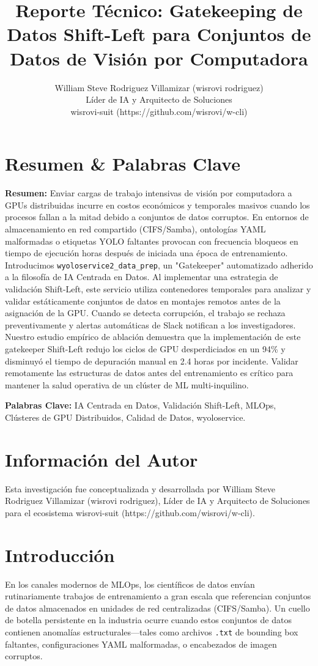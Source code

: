 \documentclass[11pt,a4paper]{article}
\title{Reporte Técnico: Gatekeeping de Datos Shift-Left para Conjuntos de Datos de Visión por Computadora}
\author{William Steve Rodriguez Villamizar (wisrovi rodriguez)\\Líder de IA y Arquitecto de Soluciones\\wisrovi-suit (https://github.com/wisrovi/w-cli)}
\date{}
\begin{document}
\maketitle

\section{Resumen \& Palabras Clave}
\textbf{Resumen:} Enviar cargas de trabajo intensivas de visión por computadora a GPUs distribuidas incurre en costos económicos y temporales masivos cuando los procesos fallan a la mitad debido a conjuntos de datos corruptos. En entornos de almacenamiento en red compartido (CIFS/Samba), ontologías YAML malformadas o etiquetas YOLO faltantes provocan con frecuencia bloqueos en tiempo de ejecución horas después de iniciada una época de entrenamiento. Introducimos \texttt{wyoloservice2\_data\_prep}, un "Gatekeeper" automatizado adherido a la filosofía de IA Centrada en Datos. Al implementar una estrategia de validación Shift-Left, este servicio utiliza contenedores temporales para analizar y validar estáticamente conjuntos de datos en montajes remotos antes de la asignación de la GPU. Cuando se detecta corrupción, el trabajo se rechaza preventivamente y alertas automáticas de Slack notifican a los investigadores. Nuestro estudio empírico de ablación demuestra que la implementación de este gatekeeper Shift-Left redujo los ciclos de GPU desperdiciados en un 94\% y disminuyó el tiempo de depuración manual en 2.4 horas por incidente. Validar remotamente las estructuras de datos antes del entrenamiento es crítico para mantener la salud operativa de un clúster de ML multi-inquilino.

\textbf{Palabras Clave:} IA Centrada en Datos, Validación Shift-Left, MLOps, Clústeres de GPU Distribuidos, Calidad de Datos, wyoloservice.

\section{Información del Autor}
Esta investigación fue conceptualizada y desarrollada por William Steve Rodriguez Villamizar (wisrovi rodriguez), Líder de IA y Arquitecto de Soluciones para el ecosistema wisrovi-suit (https://github.com/wisrovi/w-cli).

\section{Introducción}
En los canales modernos de MLOps, los científicos de datos envían rutinariamente trabajos de entrenamiento a gran escala que referencian conjuntos de datos almacenados en unidades de red centralizadas (CIFS/Samba). Un cuello de botella persistente en la industria ocurre cuando estos conjuntos de datos contienen anomalías estructurales—tales como archivos \texttt{.txt} de bounding box faltantes, configuraciones YAML malformadas, o encabezados de imagen corruptos.
\end{document}
